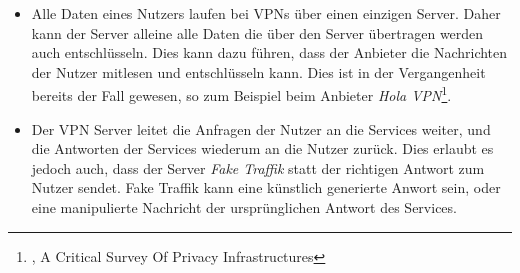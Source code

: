 \begin{itemize}
    \item Alle Daten eines Nutzers laufen bei VPNs über einen einzigen Server. Daher kann der Server alleine alle Daten die über den Server übertragen werden auch entschlüsseln. Dies kann dazu führen, dass der Anbieter die Nachrichten der Nutzer mitlesen und entschlüsseln kann. Dies ist in der Vergangenheit bereits der Fall gewesen, so zum Beispiel beim Anbieter \textit{Hola VPN}\footnote{\cite{VPNCriticalSurvey}, A Critical Survey Of Privacy Infrastructures}.
    \item Der VPN Server leitet die Anfragen der Nutzer an die Services weiter, und die Antworten der Services wiederum an die Nutzer zurück. Dies erlaubt es jedoch auch, dass der Server \textit{Fake Traffik} statt der richtigen Antwort zum Nutzer sendet. Fake Traffik kann eine künstlich generierte Anwort sein, oder eine manipulierte Nachricht der ursprünglichen Antwort des Services.
\end{itemize}
